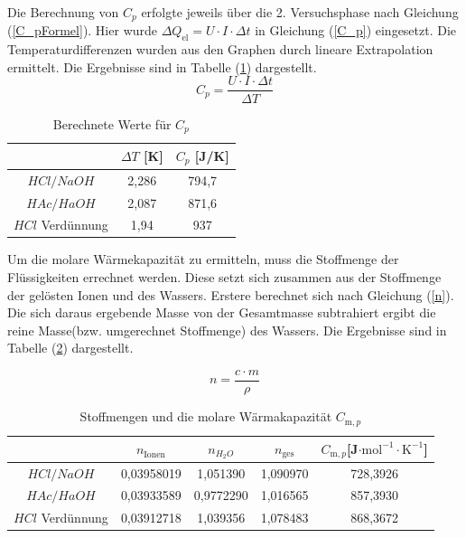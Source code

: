 \documentclass[12pt,a4paper,titlepage,headinclude,bibtotoc]{scrartcl}
\begin{document}
Die Berechnung von $C_p$ erfolgte jeweils über die 2. Versuchsphase nach Gleichung (\ref{C_pFormel}). Hier wurde $\Delta Q_{\mathrm{el}}= U\cdot I \cdot \Delta t$ in Gleichung (\ref{C_p}) eingesetzt. Die Temperaturdifferenzen wurden aus den Graphen durch lineare Extrapolation ermittelt. Die Ergebnisse sind in Tabelle (\ref{C_pTabelle}) dargestellt.\\

\begin{equation} \label{C_pFormel}
C_p=\frac{U\cdot I\cdot \Delta t}{\Delta T}
\end{equation}

\FloatBarrier
\begin{table} \caption{Berechnete Werte für $C_p$}
\label{C_pTabelle} 
\begin{tabular}{c|c|c} 
&$\Delta T$ [K] &$C_p$ [J/K]\\
\hline
$HCl/NaOH$&2,286&794,7\\
\hline	
$HAc/HaOH$&2,087&871,6\\
\hline
$HCl$ Verdünnung&1,94&937\\
\end{tabular} 
\end{table}

 
Um die molare Wärmekapazität zu ermitteln, muss die Stoffmenge der Flüssigkeiten errechnet werden. Diese setzt sich zusammen aus der Stoffmenge der gelösten Ionen und des Wassers. Erstere berechnet sich nach Gleichung (\ref{n}). Die sich daraus ergebende Masse von der Gesamtmasse subtrahiert ergibt die reine Masse(bzw. umgerechnet Stoffmenge) des Wassers. Die Ergebnisse sind in Tabelle (\ref{StoffmengenTabelle}) dargestellt.
 
\begin{equation}\label{n}
n=\frac{c \cdot m}{\rho}
\end{equation}

\begin{table} \caption{Stoffmengen und die molare Wärmakapazität $C_{\mathrm{m},p}$}
\label{StoffmengenTabelle} 
\begin{tabular}{c|c|c|c|c}
&$n_\mathrm{Ionen}$& $n_{H_2O}$&$n_\mathrm{ges}$&$C_{\mathrm{m},p}$[J$\cdot \mathrm{mol}^{-1}\cdot \mathrm{K}^{-1}$]\\
\hline
$HCl/NaOH$&0,03958019&1,051390&1,090970&728,3926\\
\hline	
$HAc/HaOH$&0,03933589&0,9772290&1,016565&857,3930\\
\hline
$HCl$ Verdünnung&0,03912718&1,039356&1,078483&868,3672\\
\end{tabular} 
\end{table}
\FloatBarrier
\end{document}
